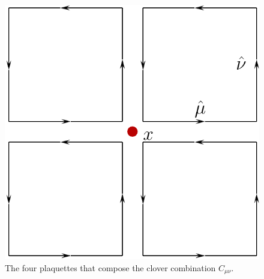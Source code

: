 \begin{figure}[htb!]
\centering
\includegraphics[width=0.5\linewidth]{./Clover.pdf}
\caption{\label{fig:Clover}The four plaquettes that compose the clover combination $C_{\mu\nu}$.}
\end{figure}

